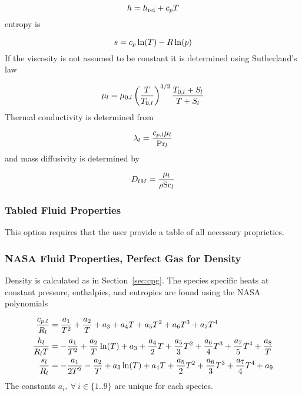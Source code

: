\begin{equation}
	h = h_{\text{ref}} + c_{p} T
\end{equation}
entropy is

\begin{equation}
	s = c_{p} \ln(T) - R \ln(p)	
\end{equation}
If the viscosity is not assumed to be constant it is determined using Sutherland's law

\begin{equation}
	\mu_{l} = \mu_{0,l} \left(\frac{T}{T_{0,l}}\right)^{3/2} \frac{T_{0,l} + S_{l}}{T + S_{l}} 
\end{equation}
Thermal conductivity is determined from

\begin{equation}
	\lambda_{l} = \frac{c_{p,l} \mu_{l}}{\text{Pr}_{l}}
\end{equation}
and mass diffusivity is determined by

\begin{equation}
	D_{l M} = \frac{\mu_{l}}{\rho \text{Sc}_{l}}
\end{equation}

\subsubsection{Tabled Fluid Properties}

This option requires that the user provide a table of all necessary proprieties.

\subsubsection{NASA Fluid Properties, Perfect Gas for Density}\label{sec:tpg}

Density is calculated as in Section~\ref{sec:cpg}. The species specific heats at constant pressure, enthalpies, and entropies are found using the NASA polynomials

\begin{align}
	\frac{c_{p,l}}{R_{l}} &= \frac{a_1}{T^2} + \frac{a_2}{T} + a_3 + a_4 T + a_5 T^2 + a_6 T^3 + a_7 T^4 \\
	\frac{h_{l}}{R_{l} T} &= -\frac{a_1}{T^2} + \frac{a_2}{T}\ln(T) + a_3 + \frac{a_4}{2} T + \frac{a_5}{3} T^2 + \frac{a_6}{4} T^3 + \frac{a_7}{5} T^4 + \frac{a_8}{T} \\
	\frac{s_{l}}{R_{l}} &= -\frac{a_1}{2T^2} - \frac{a_2}{T} + a_3 \ln(T) + a_4 T + \frac{a_5}{2} T^2 + \frac{a_6}{3} T^3 + \frac{a_7}{4} T^4 + a_9
\end{align}
The constants $a_i, \ \forall \ i \in \{1..9\}$ are unique for each species.

